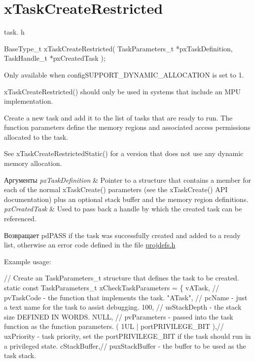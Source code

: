 \hypertarget{group__x_task_create_restricted}{}\section{x\+Task\+Create\+Restricted}
\label{group__x_task_create_restricted}
task. h 
\begin{DoxyPre}
 BaseType\_t xTaskCreateRestricted( TaskParameters\_t *pxTaskDefinition, TaskHandle\_t *pxCreatedTask );\end{DoxyPre}


Only available when config\+S\+U\+P\+P\+O\+R\+T\+\_\+\+D\+Y\+N\+A\+M\+I\+C\+\_\+\+A\+L\+L\+O\+C\+A\+T\+I\+ON is set to 1.

x\+Task\+Create\+Restricted() should only be used in systems that include an M\+PU implementation.

Create a new task and add it to the list of tasks that are ready to run. The function parameters define the memory regions and associated access permissions allocated to the task.

See x\+Task\+Create\+Restricted\+Static() for a version that does not use any dynamic memory allocation.


\begin{DoxyParams}{Аргументы}
{\em px\+Task\+Definition} & Pointer to a structure that contains a member for each of the normal x\+Task\+Create() parameters (see the x\+Task\+Create() A\+PI documentation) plus an optional stack buffer and the memory region definitions.\\
\hline
{\em px\+Created\+Task} & Used to pass back a handle by which the created task can be referenced.\\
\hline
\end{DoxyParams}
\begin{DoxyReturn}{Возвращает}
pd\+P\+A\+SS if the task was successfully created and added to a ready list, otherwise an error code defined in the file \mbox{\hyperlink{projdefs_8h}{projdefs.\+h}}
\end{DoxyReturn}
Example usage\+: 
\begin{DoxyPre}
// Create an TaskParameters\_t structure that defines the task to be created.
static const TaskParameters\_t xCheckTaskParameters =
\{
    vATask,     // pvTaskCode - the function that implements the task.
    "ATask",    // pcName - just a text name for the task to assist debugging.
    100,        // usStackDepth - the stack size DEFINED IN WORDS.
    NULL,       // pvParameters - passed into the task function as the function parameters.
    ( 1UL | portPRIVILEGE\_BIT ),// uxPriority - task priority, set the portPRIVILEGE\_BIT if the task should run in a privileged state.
    cStackBuffer,// puxStackBuffer - the buffer to be used as the task stack.\end{DoxyPre}



